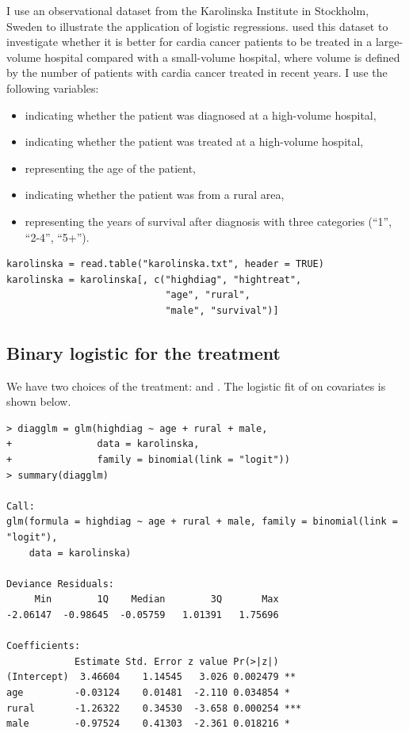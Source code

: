 I use an observational dataset from the Karolinska Institute in Stockholm, Sweden to illustrate the application of logistic regressions. \citet{rubin2008objective} used this dataset to investigate whether it is better for cardia cancer patients to be treated in a large-volume hospital compared with a small-volume hospital, where volume is defined by the number of patients with cardia cancer treated in recent years. I use the following variables: 
\begin{itemize}
\item
{} indicating whether the patient was diagnosed at a high-volume hospital,
\item
{} indicating whether the patient was treated at a high-volume hospital,
\item
{} representing the age of the patient,
\item
{} indicating whether the patient was from a rural area,
\item
{} representing the years of survival after diagnosis with three categories (``1'', ``2-4'', ``5+''). 
\end{itemize}


 
\begin{lstlisting}
karolinska = read.table("karolinska.txt", header = TRUE)
karolinska = karolinska[, c("highdiag", "hightreat",
                            "age", "rural", 
                            "male", "survival")]
\end{lstlisting}


\subsection{Binary logistic for the treatment}


We have two choices of the treatment:  and . The logistic fit of  on covariates is shown below.

\begin{lstlisting}
> diagglm = glm(highdiag ~ age + rural + male, 
+               data = karolinska, 
+               family = binomial(link = "logit"))
> summary(diagglm)

Call:
glm(formula = highdiag ~ age + rural + male, family = binomial(link = "logit"), 
    data = karolinska)

Deviance Residuals: 
     Min        1Q    Median        3Q       Max  
-2.06147  -0.98645  -0.05759   1.01391   1.75696  

Coefficients:
            Estimate Std. Error z value Pr(>|z|)    
(Intercept)  3.46604    1.14545   3.026 0.002479 ** 
age         -0.03124    0.01481  -2.110 0.034854 *  
rural       -1.26322    0.34530  -3.658 0.000254 ***
male        -0.97524    0.41303  -2.361 0.018216 *  
\end{lstlisting}

